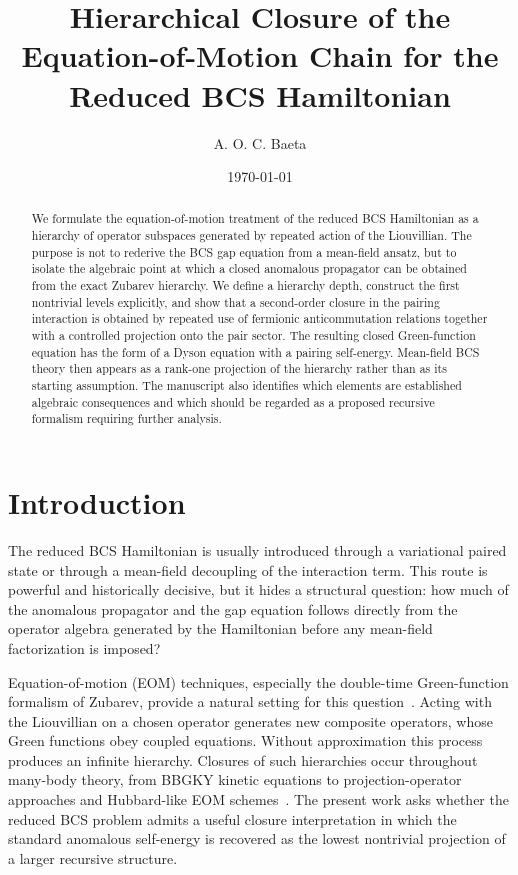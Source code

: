 \documentclass[aps,prb,reprint,superscriptaddress,nofootinbib]{revtex4-2}
\begin{document}
\title{Hierarchical Closure of the Equation-of-Motion Chain for the Reduced BCS Hamiltonian}

\author{A. O. C. Baeta}

\date{\today}

\begin{abstract}
We formulate the equation-of-motion treatment of the reduced BCS Hamiltonian as a hierarchy of operator subspaces generated by repeated action of the Liouvillian. The purpose is not to rederive the BCS gap equation from a mean-field ansatz, but to isolate the algebraic point at which a closed anomalous propagator can be obtained from the exact Zubarev hierarchy. We define a hierarchy depth, construct the first nontrivial levels explicitly, and show that a second-order closure in the pairing interaction is obtained by repeated use of fermionic anticommutation relations together with a controlled projection onto the pair sector. The resulting closed Green-function equation has the form of a Dyson equation with a pairing self-energy. Mean-field BCS theory then appears as a rank-one projection of the hierarchy rather than as its starting assumption. The manuscript also identifies which elements are established algebraic consequences and which should be regarded as a proposed recursive formalism requiring further analysis.
\end{abstract}

\maketitle

\section{Introduction}

The reduced BCS Hamiltonian is usually introduced through a variational paired state or through a mean-field decoupling of the interaction term. This route is powerful and historically decisive, but it hides a structural question: how much of the anomalous propagator and the gap equation follows directly from the operator algebra generated by the Hamiltonian before any mean-field factorization is imposed?

Equation-of-motion (EOM) techniques, especially the double-time Green-function formalism of Zubarev, provide a natural setting for this question~\cite{Zubarev1960}. Acting with the Liouvillian on a chosen operator generates new composite operators, whose Green functions obey coupled equations. Without approximation this process produces an infinite hierarchy. Closures of such hierarchies occur throughout many-body theory, from BBGKY kinetic equations to projection-operator approaches and Hubbard-like EOM schemes~\cite{Yvon1935,BornGreen1946,Kirkwood1946,Bogoliubov1962,Mori1965,Zwanzig1960,Hubbard1963}. The present work asks whether the reduced BCS problem admits a useful closure interpretation in which the standard anomalous self-energy is recovered as the lowest nontrivial projection of a larger recursive structure.
\end{document}
